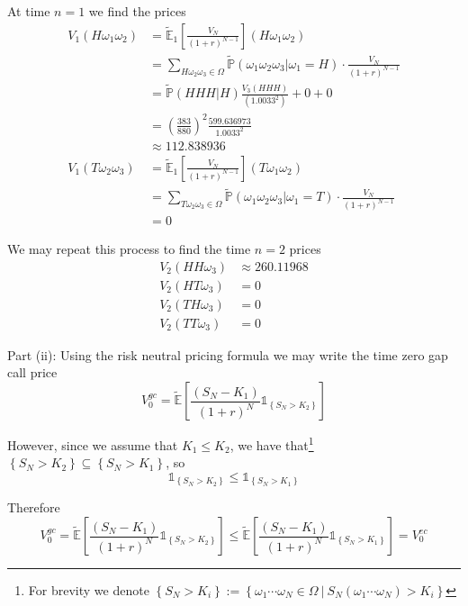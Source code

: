 \documentclass[12pt]{article}
\renewcommand{\P}{\mathbb P}
\newcommand{\E}{\mathbb E}
\begin{document}
At time $n = 1$ we find the prices
\begin{align*}
	V_1(H\omega_1\omega_2) &= \tilde{\E}_1 \left[ \frac{V_N}{(1 + r)^{N - 1}} \right](H\omega_1\omega_2) \\
	&= \sum_{H\omega_2\omega_3 \in \Omega} \tilde{\P}(\omega_1\omega_2\omega_3|\omega_1 = H) \cdot \frac{V_N}{(1 + r)^{N - 1}} \\
	&= \tilde{\P}(HHH|H) \frac{V_3(HHH)}{(1.0033^2)} + 0 + 0 \\
	&= \left( \frac{383}{880} \right)^2 \frac{599.636973}{1.0033^2} \\
	&\approx 112.838936 \\
	V_1(T\omega_2\omega_3) &= \tilde{\E}_1 \left[ \frac{V_N}{(1 + r)^{N - 1}} \right](T\omega_1\omega_2) \\
	&= \sum_{T\omega_2\omega_3 \in \Omega} \tilde{\P}(\omega_1\omega_2\omega_3|\omega_1 = T) \cdot \frac{V_N}{(1 + r)^{N - 1}} \\
	&= 0
\end{align*}


We may repeat this process to find the time $n = 2$ prices
\begin{align*}
	V_2(HH\omega_3) &\approx 260.11968 \\
	V_2(HT\omega_3) &= 0 \\
	V_2(TH\omega_3) &= 0 \\
	V_2(TT\omega_3) &= 0 
\end{align*}

Part (ii): Using the risk neutral pricing formula we may write the time zero gap call price
\begin{equation*}
	V^{gc}_0 = \tilde{\E} \left[ \frac{(S_N - K_1)}{(1 + r)^N} \mathds 1_{\left\{S_N > K_2 \right\} } \right]
\end{equation*}

However, since we assume that $K_1 \leq K_2$, we have that\footnote{For brevity we denote $\left\{ S_N > K_i \right\} := \left\{ \omega_1\cdots\omega_N \in \Omega~|~ S_N(\omega_1\cdots\omega_N) > K_i \right\} $} $\left\{S_N > K_2 \right\} \subseteq \left\{ S_N > K_1 \right\}$, so
\begin{equation*}
	\mathds 1_{\left\{S_N > K_2 \right\} } \leq \mathds 1_{\left\{S_N > K_1 \right\} }
\end{equation*}

Therefore
\begin{equation*}
	V^{gc}_0 = \tilde{\E} \left[ \frac{(S_N - K_1)}{(1 + r)^N} \mathds 1_{\left\{S_N > K_2 \right\} } \right] \leq \tilde{\E} \left[ \frac{(S_N - K_1)}{(1 + r)^N} \mathds 1_{\left\{S_N > K_1 \right\} } \right] = V^{ec}_0
\end{equation*}
\end{document}
